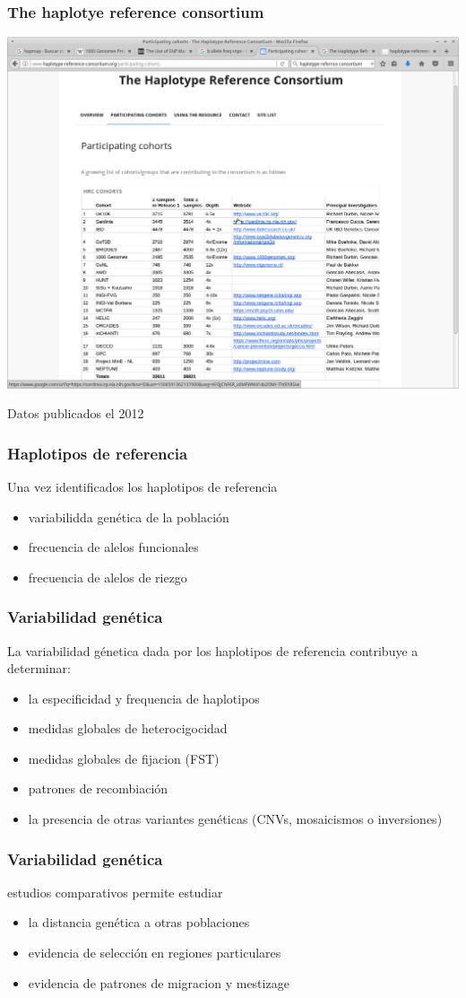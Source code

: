 \documentclass{beamer}\usepackage[]{graphicx}\usepackage[]{color}
\begin{document}
\begin{frame}[fragile]
\frametitle{The haplotye reference consortium}

\begin{center}
\includegraphics[width=0.5\linewidth]{haplotref.png}
\end{center}
Datos publicados el 2012
\end{frame}


\begin{frame}[fragile]
\frametitle{Haplotipos de referencia}

Una vez identificados los haplotipos de referencia
\begin{itemize}
\item variabilidda gen\'etica de la poblaci\'on
\item frecuencia de alelos funcionales
\item frecuencia de alelos de riezgo
\end{itemize}

\end{frame}

\begin{frame}[fragile]
\frametitle{Variabilidad gen\'etica}

La variabilidad g\'enetica dada por los haplotipos de referencia contribuye a determinar:

\begin{itemize}
\item la especificidad y frequencia de haplotipos 
\item medidas globales de heterocigocidad 
\item medidas globales de fijacion (FST)
\item patrones de recombiaci\'on
\item la presencia de otras variantes gen\'eticas (CNVs, mosaicismos o inversiones)
\end{itemize}
\end{frame}


\begin{frame}[fragile]
\frametitle{Variabilidad gen\'etica}
estudios comparativos permite estudiar
\begin{itemize}
\item la distancia gen\'etica a otras poblaciones 
\item evidencia de selecci\'on en regiones particulares
\item evidencia de patrones de migracion y mestizage
\end{itemize}
\end{frame}
\end{document}
